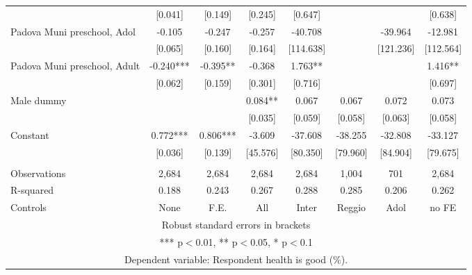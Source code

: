 \begin{tabular}{lccccccc}
 & [0.041] & [0.149] & [0.245] & [0.647] &  &  & [0.638] \\
Padova Muni preschool, Adol & -0.105 & -0.247 & -0.257 & -40.708 &  & -39.964 & -12.981 \\
 & [0.065] & [0.160] & [0.164] & [114.638] &  & [121.236] & [112.564] \\
Padova Muni preschool, Adult & -0.240*** & -0.395** & -0.368 & 1.763** &  &  & 1.416** \\
 & [0.062] & [0.159] & [0.301] & [0.716] &  &  & [0.697] \\
Male dummy &  &  & 0.084** & 0.067 & 0.067 & 0.072 & 0.073 \\
 &  &  & [0.035] & [0.059] & [0.058] & [0.063] & [0.058] \\
Constant & 0.772*** & 0.806*** & -3.609 & -37.608 & -38.255 & -32.808 & -33.127 \\
 & [0.036] & [0.139] & [45.576] & [80.350] & [79.960] & [84.904] & [79.675] \\
 &  &  &  &  &  &  &  \\
Observations & 2,684 & 2,684 & 2,684 & 2,684 & 1,004 & 701 & 2,684 \\
R-squared & 0.188 & 0.243 & 0.267 & 0.288 & 0.285 & 0.206 & 0.262 \\
 Controls & None & F.E. & All & Inter & Reggio & Adol & no FE \\ \hline
\multicolumn{8}{c}{ Robust standard errors in brackets} \\
\multicolumn{8}{c}{ *** p$<$0.01, ** p$<$0.05, * p$<$0.1} \\
\multicolumn{8}{c}{ Dependent variable: Respondent health is good (\%).} \\
\end{tabular}
